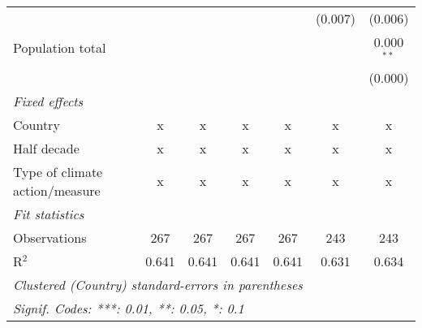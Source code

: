 \begin{tabular}{lcccccc}
                                           &              &         &              &         & (0.007) & (0.006)\\   
   Population total                        &              &         &              &         &         & 0.000$^{**}$\\   
                                           &              &         &              &         &         & (0.000)\\   
   \emph{Fixed effects}\\
   Country                                 & x            & x       & x            & x       & x       & x\\  
   Half decade                             & x            & x       & x            & x       & x       & x\\  
   Type of climate action/measure          & x            & x       & x            & x       & x       & x\\  
   \midrule \emph{Fit statistics}\\
   Observations                            & 267          & 267     & 267          & 267     & 243     & 243\\  
   R$^2$                                   & 0.641        & 0.641   & 0.641        & 0.641   & 0.631   & 0.634\\  
   \midrule
   \multicolumn{7}{l}{\emph{Clustered (Country) standard-errors in parentheses}}\\
   \multicolumn{7}{l}{\emph{Signif. Codes: ***: 0.01, **: 0.05, *: 0.1}}\\
\end{tabular}
\par\endgroup


